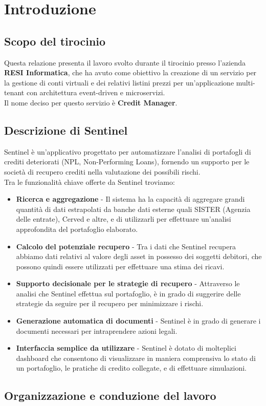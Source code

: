 \chapter{Introduzione}

\section{Scopo del tirocinio}
Questa relazione presenta il lavoro svolto durante il tirocinio presso l'azienda \textbf{RESI Informatica}, che ha avuto come obiettivo la creazione di un servizio per la
gestione di conti virtuali e dei relativi listini prezzi per un'applicazione multi-tenant con architettura event-driven e microservizi.
\\
Il nome deciso per questo servizio \`e \textbf{Credit Manager}.

\section{Descrizione di Sentinel}
Sentinel \`e un'applicativo progettato per automatizzare l'analisi di portafogli di crediti deteriorati (NPL, Non-Performing Loans), fornendo un supporto per le societ\`a
di recupero crediti nella valutazione dei possibili rischi.
\\
Tra le funzionalit\`a chiave offerte da Sentinel troviamo:
\begin{itemize}
  \item \textbf{Ricerca e aggregazione} - Il sistema ha la capacit\`a di aggregare grandi quantit\`a di dati estrapolati da banche dati esterne quali SISTER (Agenzia delle entrate), Cerved e altre, e di utilizzarli
    per effettuare un'analisi approfondita del portafoglio elaborato.
  \item \textbf{Calcolo del potenziale recupero} - Tra i dati che Sentinel recupera abbiamo dati relativi al valore degli asset in possesso dei soggetti debitori, che possono
    quindi essere utilizzati per effettuare una stima dei ricavi.
  \item \textbf{Supporto decisionale per le strategie di recupero} - Attraverso le analisi che Sentinel effettua sul portafoglio, \`e in grado di suggerire delle strategie
    da seguire per il recupero per minimizzare i rischi.
  \item \textbf{Generazione automatica di documenti} - Sentinel \`e in grado di generare i documenti necessari per intraprendere azioni legali.
  \item \textbf{Interfaccia semplice da utilizzare} - Sentinel \`e dotato di molteplici dashboard che consentono di visualizzare in maniera comprensiva lo stato di un portafoglio,
    le pratiche di credito collegate, e di effettuare simulazioni.
\end{itemize}

\section{Organizzazione e conduzione del lavoro}
